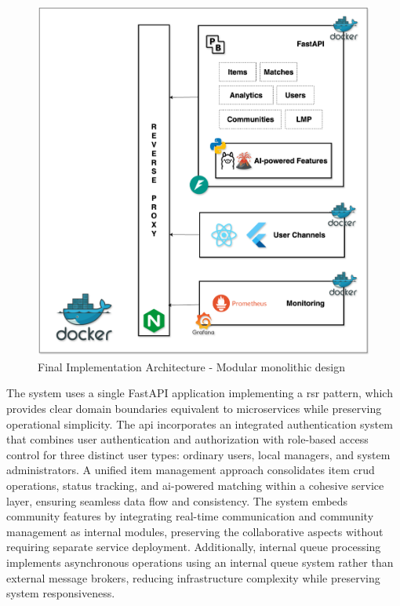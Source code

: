 \begin{figure}[htbp]
    \centering
    \includegraphics[width=\textwidth]{figs/chapter3/final_implementation_architecture.png}
    \caption[Final Implementation Architecture]{Final Implementation Architecture - Modular monolithic design}
    \label{fig:final_implementation_architecture}
\end{figure}

The system uses a single FastAPI application implementing a \ac{rsr} pattern, which provides clear domain boundaries equivalent to microservices while preserving operational simplicity. The \ac{api} incorporates an integrated authentication system that combines user authentication and authorization with role-based access control for three distinct user types: ordinary users, local managers, and system administrators. A unified item management approach consolidates item \ac{crud} operations, status tracking, and \ac{ai}-powered matching within a cohesive service layer, ensuring seamless data flow and consistency. The system embeds community features by integrating real-time communication and community management as internal modules, preserving the collaborative aspects without requiring separate service deployment. Additionally, internal queue processing implements asynchronous operations using an internal queue system rather than external message brokers, reducing infrastructure complexity while preserving system responsiveness.

